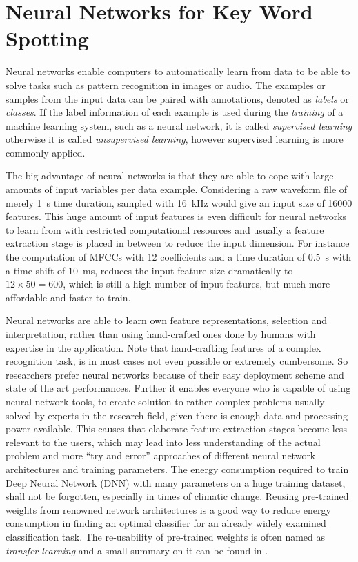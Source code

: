 
\section{Neural Networks for Key Word Spotting}\label{sec:intro_nn}
\thesisStateRevised
Neural networks enable computers to automatically learn from data to be able to solve tasks such as pattern recognition in images or audio.
The examples or samples from the input data can be paired with annotations, denoted as \emph{labels} or \emph{classes}.
If the label information of each example is used during the \emph{training} of a machine learning system, such as a neural network, it is called \emph{supervised learning} otherwise it is called \emph{unsupervised learning}, however supervised learning is more commonly applied.

The big advantage of neural networks is that they are able to cope with large amounts of input variables per data example.
Considering a raw waveform file of merely \SI{1}{s} time duration, sampled with \SI{16}{\kilo\hertz} would give an input size of 16000 features.
This huge amount of input features is even difficult for neural networks to learn from with restricted computational resources and usually a feature extraction stage is placed in between to reduce the input dimension.
For instance the computation of MFCCs with 12 coefficients and a time duration of \SI{0.5}{s} with a time shift of \SI{10}{\milli\second}, reduces the input feature size dramatically to $12 \times 50 = 600$, which is still a high number of input features, but much more affordable and faster to train.

Neural networks are able to learn own feature representations, selection and interpretation, rather than using hand-crafted ones done by humans with expertise in the application.
Note that hand-crafting features of a complex recognition task, is in most cases not even possible or extremely cumbersome.
So researchers prefer neural networks because of their easy deployment scheme and state of the art performances.
Further it enables everyone who is capable of using neural network tools, to create solution to rather complex problems usually solved by experts in the research field, given there is enough data and processing power available.
This causes that elaborate feature extraction stages become less relevant to the users, which may lead into less understanding of the actual problem and more \enquote{try and error} approaches of different neural network architectures and training parameters.
The energy consumption required to train Deep Neural Network (DNN) with many parameters on a huge training dataset, shall not be forgotten, especially in times of climatic change.
Reusing pre-trained weights from renowned network architectures is a good way to reduce energy consumption in finding an optimal classifier for an already widely examined classification task.
The re-usability of pre-trained weights is often named as \emph{transfer learning} and a small summary on it can be found in \cite{TransferLearning}.

